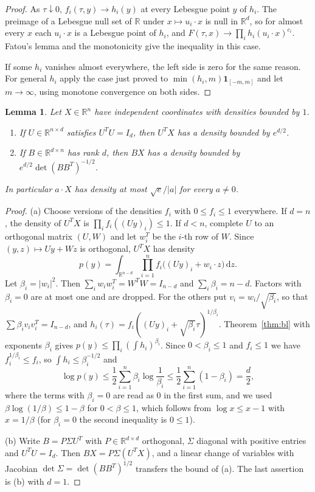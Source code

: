 \documentclass[11pt]{amsart}
\numberwithin{equation}{section}
\newtheorem{lemma}[theorem]{Lemma}
\theoremstyle{definition}
\theoremstyle{remark}
\newcommand{\R}{\mathbb R}
\newcommand{\1}{\mathbf 1}
\newcommand{\dd}{\,\mathrm d}
\newcommand{\abs}[1]{\lvert #1\rvert}
\begin{document}
\begin{proof}
As $\tau\downarrow0$, $f_i(\tau,y)\to h_i(y)$ at every Lebesgue point $y$ of $h_i$. The preimage of a Lebesgue null set of $\R$ under $x\mapsto u_i\cdot x$ is null in $\R^d$, so for almost every $x$ each $u_i\cdot x$ is a Lebesgue point of $h_i$, and $F(\tau,x)\to\prod_ih_i(u_i\cdot x)^{c_i}$. Fatou's lemma and the monotonicity give the inequality in this case.

If some $h_i$ vanishes almost everywhere, the left side is zero for the same reason. For general $h_i$ apply the case just proved to $\min(h_i,m)\1_{[-m,m]}$ and let $m\to\infty$, using monotone convergence on both sides.
\end{proof}

\begin{lemma}\label{lem:projection}
Let $X\in\R^n$ have independent coordinates with densities bounded by $1$.
\begin{enumerate}
\item[(a)] If $U\in\R^{n\times d}$ satisfies $U^TU=I_d$, then $U^TX$ has a density bounded by $e^{d/2}$.
\item[(b)] If $B\in\R^{d\times n}$ has rank $d$, then $BX$ has a density bounded by $e^{d/2}\det(BB^T)^{-1/2}$.
\end{enumerate}
In particular $a\cdot X$ has density at most $\sqrt e/\abs a$ for every $a\ne0$.
\end{lemma}

\begin{proof}
(a) Choose versions of the densities $f_i$ with $0\le f_i\le1$ everywhere. If $d=n$, the density of $U^TX$ is $\prod_if_i((Uy)_i)\le1$. If $d<n$, complete $U$ to an orthogonal matrix $(U,W)$ and let $w_i^T$ be the $i$-th row of $W$. Since $(y,z)\mapsto Uy+Wz$ is orthogonal, $U^TX$ has density
\[
p(y)=\int_{\R^{n-d}}\prod_{i=1}^nf_i\bigl((Uy)_i+w_i\cdot z\bigr)\dd z .
\]
Let $\beta_i=\abs{w_i}^2$. Then $\sum_iw_iw_i^T=W^TW=I_{n-d}$ and $\sum_i\beta_i=n-d$. Factors with $\beta_i=0$ are at most one and are dropped. For the others put $v_i=w_i/\sqrt{\beta_i}$, so that $\sum\beta_iv_iv_i^T=I_{n-d}$, and $h_i(\tau)=f_i((Uy)_i+\sqrt{\beta_i}\tau)^{1/\beta_i}$. Theorem~\ref{thm:bl} with exponents $\beta_i$ gives $p(y)\le\prod_i(\int h_i)^{\beta_i}$. Since $0<\beta_i\le1$ and $f_i\le1$ we have $f_i^{1/\beta_i}\le f_i$, so $\int h_i\le\beta_i^{-1/2}$ and
\[
\log p(y)\le\frac12\sum_{i=1}^n\beta_i\log\frac1{\beta_i}\le\frac12\sum_{i=1}^n(1-\beta_i)=\frac d2,
\]
where the terms with $\beta_i=0$ are read as $0$ in the first sum, and we used $\beta\log(1/\beta)\le1-\beta$ for $0<\beta\le1$, which follows from $\log x\le x-1$ with $x=1/\beta$ (for $\beta_i=0$ the second inequality is $0\le1$).

(b) Write $B=P\Sigma U^T$ with $P\in\R^{d\times d}$ orthogonal, $\Sigma$ diagonal with positive entries and $U^TU=I_d$. Then $BX=P\Sigma(U^TX)$, and a linear change of variables with Jacobian $\det\Sigma=\det(BB^T)^{1/2}$ transfers the bound of (a). The last assertion is (b) with $d=1$.
\end{proof}
\end{document}
